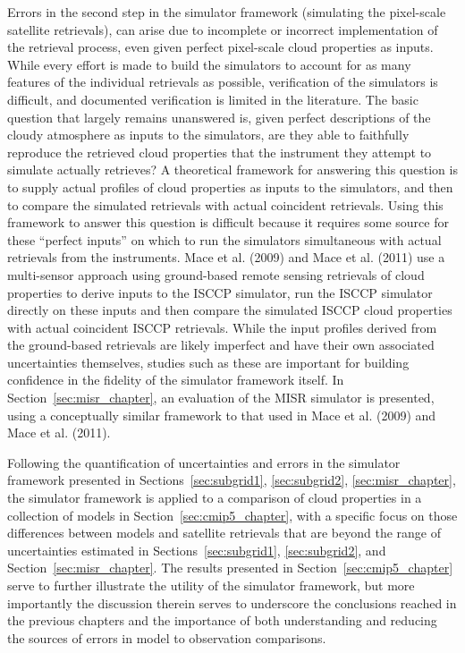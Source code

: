 Errors in the second step in the simulator framework (simulating the
pixel-scale satellite retrievals), can arise due to incomplete or
incorrect implementation of the retrieval process, even given perfect
pixel-scale cloud properties as inputs. While every effort is made to
build the simulators to account for as many features of the individual
retrievals as possible, verification of the simulators is difficult, and
documented verification is limited in the literature. The basic question
that largely remains unanswered is, given perfect descriptions of the
cloudy atmosphere as inputs to the simulators, are they able to
faithfully reproduce the retrieved cloud properties that the instrument
they attempt to simulate actually retrieves? A theoretical framework for
answering this question is to supply actual profiles of cloud properties
as inputs to the simulators, and then to compare the simulated
retrievals with actual coincident retrievals. Using this framework to
answer this question is difficult because it requires some source for
these ``perfect inputs'' on which to run the simulators simultaneous
with actual retrievals from the instruments. Mace et al. (2009) and Mace
et al. (2011) use a multi-sensor approach using ground-based remote
sensing retrievals of cloud properties to derive inputs to the ISCCP
simulator, run the ISCCP simulator directly on these inputs and then
compare the simulated ISCCP cloud properties with actual coincident
ISCCP retrievals. While the input profiles derived from the ground-based
retrievals are likely imperfect and have their own associated
uncertainties themselves, studies such as these are important for
building confidence in the fidelity of the simulator framework itself.
In Section~\ref{sec:misr_chapter}, an evaluation of the MISR simulator
is presented, using a conceptually similar framework to that used in
Mace et al. (2009) and Mace et al. (2011).

Following the quantification of uncertainties and errors in the
simulator framework presented in
Sections~\ref{sec:subgrid1}, \ref{sec:subgrid2}, \ref{sec:misr_chapter},
the simulator framework is applied to a comparison of cloud properties
in a collection of models in Section~\ref{sec:cmip5_chapter}, with a
specific focus on those differences between models and satellite
retrievals that are beyond the range of uncertainties estimated in
Sections~\ref{sec:subgrid1}, \ref{sec:subgrid2}, and
Section~\ref{sec:misr_chapter}. The results presented in
Section~\ref{sec:cmip5_chapter} serve to further illustrate the utility
of the simulator framework, but more importantly the discussion therein
serves to underscore the conclusions reached in the previous chapters
and the importance of both understanding and reducing the sources of
errors in model to observation comparisons.

